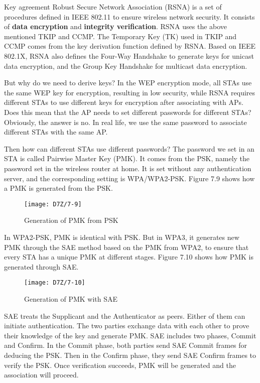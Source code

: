 \documentclass[a4paper,12pt]{book}
\begin{document}
\begin{term}{Key agreement}
    Robust Secure Network Association (RSNA) is a set of procedures defined in IEEE 802.11 to ensure wireless network security. It consists of \textbf{data encryption} and \textbf{integrity verification}. RSNA uses the above mentioned TKIP and CCMP. The Temporary Key (TK) used in TKIP and CCMP comes from the key derivation function defined by RSNA. Based on IEEE 802.1X, RSNA also defines the Four-Way Handshake to generate keys for unicast data encryption, and the Group Key Handshake for multicast data encryption.

    \parskip 6pt
    But why do we need to derive keys? In the WEP encryption mode, all STAs use the same WEP key for encryption, resulting in low security, while RSNA requires different STAs to use different keys for encryption after associating with APs. Does this mean that the AP needs to set different passwords for different STAs? Obviously, the answer is no. In real life, we use the same password to associate different STAs with the same AP.
    
    Then how can different STAs use different passwords? The password we set in an STA is called Pairwise Master Key (PMK). It comes from the PSK, namely the password set in the wireless router at home. It is set without any authentication server, and the corresponding setting is WPA/WPA2-PSK. Figure 7.9 shows how a PMK is generated from the PSK.

    \begin{figure}[!h]
        \centering
        \texttt{[image: D7Z/7-9]}
        \caption{Generation of PMK from PSK}
    \end{figure}
    
    In WPA2-PSK, PMK is identical with PSK. But in WPA3, it generates new PMK through the SAE method based on the PMK from WPA2, to ensure that every STA has a unique PMK at different stages. Figure 7.10 shows how PMK is generated through SAE.

    \begin{figure}[!h]
        \centering
        \texttt{[image: D7Z/7-10]}
        \caption{Generation of PMK with SAE}
    \end{figure}

    SAE treats the Supplicant and the Authenticator as peers. Either of them can initiate authentication. The two parties exchange data with each other to prove their knowledge of the key and generate PMK. SAE includes two phases, Commit and Confirm. In the Commit phase, both parties send SAE Commit frames for deducing the PSK. Then in the Confirm phase, they send SAE Confirm frames to verify the PSK. Once verification succeeds, PMK will be generated and the association will proceed.


\end{term}
\end{document}
